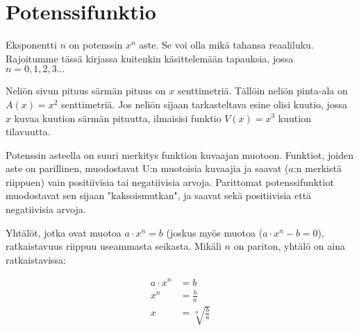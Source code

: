 \chapter{Potenssifunktio}


Eksponentti $n$ on potenssin $x^n$ aste. Se voi olla mikä tahansa reaaliluku. Rajoitumme tässä kirjassa kuitenkin käsittelemään tapauksia, jossa $n = 0, 1, 2, 3\ldots $

\begin{esimerkki}
Neliön sivun pituus särmän pituus on $x$ senttimetriä. Tällöin neliön pinta-ala on $A(x)=x^2$ senttimetriä. Jos neliön sijaan tarkasteltava esine olisi kuutio, jossa $x$ kuvaa kuution särmän pituutta, ilmaisisi funktio $V(x)=x^3$ kuution tilavuutta.
\end{esimerkki}

Potenssin asteella on suuri merkitys funktion kuvaajan muotoon. Funktiot, joiden aste on parillinen, muodostavat U:n muotoisia kuvaajia ja saavat ($a$:n merkistä riippuen) vain positiivisia tai negatiivisia arvoja. Parittomat potenssifunktiot muodostavat sen sijaan "kaksoismutkan", ja saavat sekä positiivisia että negatiivisia arvoja.


Yhtälöt, jotka ovat muotoa $a\cdot x^n = b$ (joskus myös muotoa  ($a\cdot x^n - b = 0$), ratkaistavuus riippuu useammasta seikasta. Mikäli $n$ on pariton, yhtälö on aina ratkaistavissa:

\begin{align*}
a\cdot x^n &= b \\
x^n &= \frac{b}{a} \\
x &= \sqrt[n]{\frac{b}{a}}
\end{align*}

